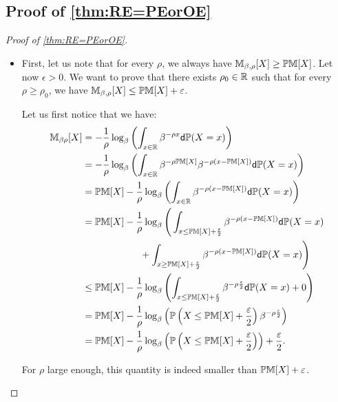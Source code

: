 \subsection{Proof of \cref{thm:RE=PEorOE}}\label{app:RE=PEorOE}

\REisPEOE*
\begin{proof}[Proof of \cref{thm:RE=PEorOE}]
    \begin{itemize}

        \item First, let us note that for every $\rho$, we always have $\mathbb{M}_{\beta,\rho}[X] \geq \mathbb{PM}[X]$.
        Let now $\epsilon > 0$.
        We want to prove that there exists $\rho_0 \in \mathbb{R}$ such that for every $\rho \geq \rho_0$, we have $\mathbb{M}_{\beta,\rho}[X] \leq \mathbb{PM}[X] + \varepsilon$.

        Let us first notice that we have:
       \begin{align*}
       \mathbb{M}_{\beta\rho}[X] &= -\frac{1}{\rho} \log_\beta \left( \int_{x \in \mathbb{R}} \beta^{-\rho x} \mathsf{d} \mathbb{P}(X = x) \right)\\
        &= -\frac{1}{\rho} \log_\beta \left( \int_{x \in \mathbb{R}} \beta^{-\rho \mathbb{PM}[X]} \beta^{-\rho (x-\mathbb{PM}[X])} \mathsf{d} \mathbb{P}(X = x) \right)\\
        &= \mathbb{PM}[X] -\frac{1}{\rho} \log_\beta \left( \int_{x \in \mathbb{R}} \beta^{-\rho (x-\mathbb{PM}[X])} \mathsf{d} \mathbb{P}(X = x) \right)\\
        &= \mathbb{PM}[X] -\frac{1}{\rho} \log_\beta \Bigg( \int_{x \leq \mathbb{PM}[X] + \frac{\varepsilon}{2}} \beta^{-\rho (x-\mathbb{PM}[X])} \mathsf{d} \mathbb{P}(X = x) \\
        &\qquad\qquad\qquad+ \int_{x \geq \mathbb{PM}[X] + \frac{\varepsilon}{2}} \beta^{-\rho (x-\mathbb{PM}[X])} \mathsf{d} \mathbb{P}(X = x) \Bigg)\\
         &\leq \mathbb{PM}[X] - \frac{1}{\rho} \log_\beta \left( \int_{x \leq \mathbb{PM}[X] + \frac{\varepsilon}{2}} \beta^{-\rho \frac{\varepsilon}{2}} \mathsf{d} \mathbb{P}(X = x) + 0 \right)\\
        &= \mathbb{PM}[X] - \frac{1}{\rho} \log_\beta \left( \mathbb{P}\left(X \leq \mathbb{PM}[X] + \frac{\varepsilon}{2}\right) \beta^{-\rho \frac{\varepsilon}{2}} \right)\\
        &= \mathbb{PM}[X] - \frac{1}{\rho} \log_\beta \left( \mathbb{P}\left(X \leq \mathbb{PM}[X] + \frac{\varepsilon}{2}\right)\right) + \frac{\varepsilon}{2}.
        \end{align*}

        For $\rho$ large enough, this quantity is indeed smaller than $\mathbb{PM}[X] + \varepsilon$.



\end{itemize}
\end{proof}
